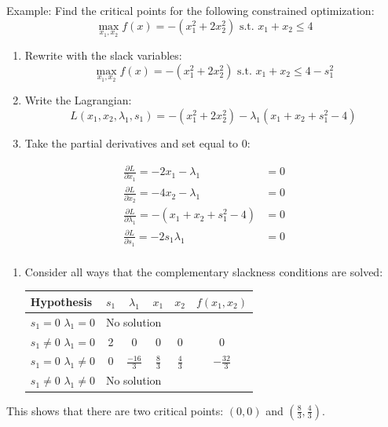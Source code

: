 \documentclass[]{book}
\providecommand{\tightlist}{%
  \setlength{\itemsep}{0pt}\setlength{\parskip}{0pt}}
\theoremstyle{definition}
\theoremstyle{definition}
\theoremstyle{definition}
\theoremstyle{remark}
\begin{document}
Example: Find the critical points for the following constrained optimization:
\[\max_{x_1,x_2} f(x) = -(x_1^2 + 2x_2^2) \text{ s.t. } x_1 + x_2 \le 4\]

\begin{enumerate}
\def\labelenumi{\arabic{enumi}.}
\item
  Rewrite with the slack variables:
  \[\max_{x_1,x_2} f(x) = -(x_1^2 + 2x_2^2) \text{ s.t. } x_1 + x_2 \le 4 - s_1^2\]
\item
  Write the Lagrangian:
  \[L(x_1,x_2,\lambda_1,s_1) = -(x_1^2 + 2x_2^2) - \lambda_1 (x_1 + x_2 + s_1^2 - 4)\]
\item
  Take the partial derivatives and set equal to 0:
\end{enumerate}

\begin{align*}
\frac{\partial L}{\partial x_1} = -2x_1 - \lambda_1  &= 0\\
\frac{\partial L}{\partial x_2}  = -4x_2 - \lambda_1 &=  0\\
\frac{\partial L}{\partial \lambda_1} = -(x_1 + x_2 + s_1^2 - 4)&= 0\\
\frac{\partial L}{\partial s_1} = -2s_1\lambda_1 &= 0\\
\end{align*}

\begin{enumerate}
\def\labelenumi{\arabic{enumi}.}
\setcounter{enumi}{3}
\tightlist
\item
  Consider all ways that the complementary slackness conditions are solved:

  \begin{center}
  \begin{tabular}{|l|cccc|c|}
  \hline
  Hypothesis & $s_1$ & $\lambda_1$ & $x_1$ & $x_2$ & $f(x_1, x_2)$\\
  \hline
  $s_1 = 0$ $\lambda_1 = 0$ & \multicolumn{4}{l|}{No solution} & \\
  $s_1 \neq 0$ $\lambda_1 = 0$ & 2 & 0 & 0 & 0  & 0\\
  $s_1 = 0$ $\lambda_1 \neq 0$ & 0 & $\frac{-16}{3}$ & $\frac{8}{3}$ & $\frac{4}{3}$ & $-\frac{32}{3}$\\
  $s_1 \neq 0$ $\lambda_1 \neq 0$ & \multicolumn{4}{l|}{No solution} &\\
  \hline
  \end{tabular}
  \end{center}
\end{enumerate}

This shows that there are two critical points: \((0,0)\) and \((\frac{8}{3},\frac{4}{3})\).
\end{document}
